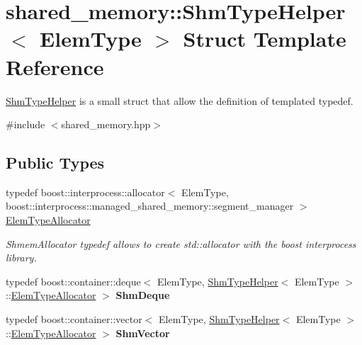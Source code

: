 \hypertarget{structshared__memory_1_1ShmTypeHelper}{}\section{shared\+\_\+memory\+:\+:Shm\+Type\+Helper$<$ Elem\+Type $>$ Struct Template Reference}
\label{structshared__memory_1_1ShmTypeHelper}


\hyperlink{structshared__memory_1_1ShmTypeHelper}{Shm\+Type\+Helper} is a small struct that allow the definition of templated typedef.  




{\ttfamily \#include $<$shared\+\_\+memory.\+hpp$>$}

\subsection*{Public Types}
\begin{DoxyCompactItemize}
\item 
typedef boost\+::interprocess\+::allocator$<$ Elem\+Type, boost\+::interprocess\+::managed\+\_\+shared\+\_\+memory\+::segment\+\_\+manager $>$ \hyperlink{structshared__memory_1_1ShmTypeHelper_a8f19a7da45c3208eade1e5943588e5da}{Elem\+Type\+Allocator}\hypertarget{structshared__memory_1_1ShmTypeHelper_a8f19a7da45c3208eade1e5943588e5da}{}\label{structshared__memory_1_1ShmTypeHelper_a8f19a7da45c3208eade1e5943588e5da}

\begin{DoxyCompactList}\small\item\em Shmem\+Allocator typedef allows to create std\+::allocator with the boost interprocess library. \end{DoxyCompactList}\item 
typedef boost\+::container\+::deque$<$ Elem\+Type, \hyperlink{structshared__memory_1_1ShmTypeHelper}{Shm\+Type\+Helper}$<$ Elem\+Type $>$\+::\hyperlink{structshared__memory_1_1ShmTypeHelper_a8f19a7da45c3208eade1e5943588e5da}{Elem\+Type\+Allocator} $>$ {\bfseries Shm\+Deque}\hypertarget{structshared__memory_1_1ShmTypeHelper_a935d582ba7497fea7a44a7e74ac9219e}{}\label{structshared__memory_1_1ShmTypeHelper_a935d582ba7497fea7a44a7e74ac9219e}

\item 
typedef boost\+::container\+::vector$<$ Elem\+Type, \hyperlink{structshared__memory_1_1ShmTypeHelper}{Shm\+Type\+Helper}$<$ Elem\+Type $>$\+::\hyperlink{structshared__memory_1_1ShmTypeHelper_a8f19a7da45c3208eade1e5943588e5da}{Elem\+Type\+Allocator} $>$ {\bfseries Shm\+Vector}\hypertarget{structshared__memory_1_1ShmTypeHelper_a306bff24c9271b479fdfd238bef10580}{}\label{structshared__memory_1_1ShmTypeHelper_a306bff24c9271b479fdfd238bef10580}

\end{DoxyCompactItemize}


